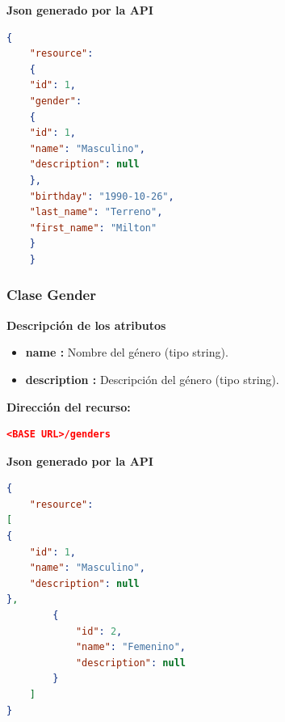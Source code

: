     \textbf{Json generado por la API}    
    \begin{lstlisting}[language=json,firstnumber=1]
    {
    "resource": 
    {
    "id": 1,
    "gender": 
    {
    "id": 1,
    "name": "Masculino",
    "description": null
    },
    "birthday": "1990-10-26",
    "last_name": "Terreno",
    "first_name": "Milton"
    }
    }
    \end{lstlisting}

\subsubsection{Clase Gender} 
    \textbf{Descripción de los atributos}
	\begin{itemize}
            \item \textbf{name :}	Nombre del género (tipo string).
            \item \textbf{description 	:}	Descripción del género (tipo string).
    \end{itemize} 
    
    \textbf{Dirección del recurso:}
    \begin{lstlisting}[language=json,firstnumber=1]
    <BASE URL>/genders
    \end{lstlisting}

    \textbf{Json generado por la API}    
        \begin{lstlisting}[language=json,firstnumber=1]
{
    "resource": 
[
{
    "id": 1,
    "name": "Masculino",
    "description": null
},
        {
            "id": 2,
            "name": "Femenino",
            "description": null
        }
    ]
}
        \end{lstlisting}

